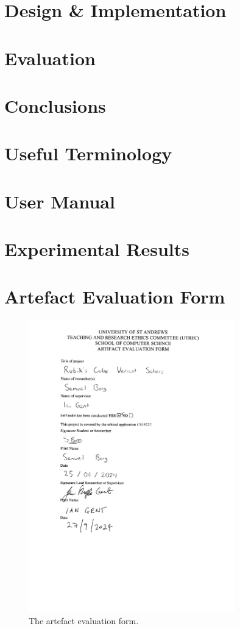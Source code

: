 \documentclass[12pt]{report}
\begin{document}
\chapter{Design \& Implementation}


\chapter{Evaluation}


\chapter{Conclusions}


\appendix

\chapter{Useful Terminology}


\chapter{User Manual}


\chapter{Experimental Results}


\chapter{Artefact Evaluation Form}
\label{appendix:artefact}
\begin{figure}[h]
    \includegraphics[width=0.8\textwidth]{Ethics.pdf}
    \centering
    \caption{The artefact evaluation form.}
\end{figure}

\printbibliography[heading=bibintoc, title={References}]
\end{document}
